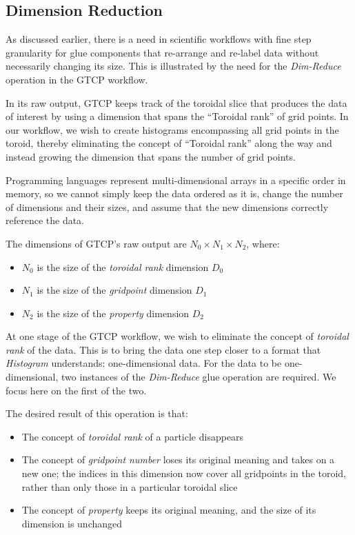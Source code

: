 \documentclass[conference]{IEEEtran}
\begin{document}
\subsection{Dimension Reduction}
\label{subsec:dimreduce}
As discussed earlier, there is a need in scientific workflows with fine
step granularity for glue components that re-arrange and re-label data
without necessarily changing its size.
This is illustrated by the need for the {\em Dim-Reduce}
operation in the GTCP workflow.

In its raw output, GTCP
keeps track of the toroidal slice that produces the data of interest by using a
dimension that spans the ``Toroidal rank'' of grid points. In our workflow, we
wish to create histograms encompassing all grid points in the toroid, thereby
eliminating the concept of ``Toroidal rank''
along the way
and instead growing the dimension
that spans the number of grid points.

Programming languages represent multi-dimensional arrays in a specific order in
memory, so we cannot simply keep the data ordered as it is, change the number
of dimensions and their sizes, and assume that the new dimensions correctly
reference the data.

The dimensions of GTCP's raw output are 
$N_0{\times}N_1{\times}N_2$, where:

\begin{itemize}

\item $N_0$ is the size of the {\em toroidal rank} dimension $D_0$

\item $N_1$ is the size of the {\em gridpoint} dimension $D_1$

\item $N_2$ is the size of the {\em property} dimension $D_2$

\end{itemize}

At one stage of the GTCP workflow, we wish to eliminate the concept of
{\em toroidal rank} of the data. This is to bring the data one step
closer to a format that {\em Histogram} understands: one-dimensional data.
For the data to be one-dimensional, two instances of the {\em Dim-Reduce}
glue operation are required. We focus here on the first of the two.

The desired result of this operation is that:

\begin{itemize}

\item The concept of {\em toroidal rank} of a particle disappears

\item The concept of {\em gridpoint number} loses its original meaning and takes
  on a new one; the indices in this dimension now cover all gridpoints in the toroid,
  rather than only those in a particular toroidal slice
  
\item The concept of {\em property} keeps its original
  meaning, and the size of its dimension is unchanged

\end{itemize}
\end{document}
